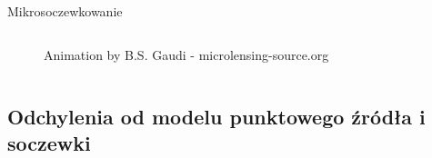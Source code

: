 \documentclass{beamer}
\begin{document}
\begin{frame}{Mikrosoczewkowanie}
\begin{columns}
\begin{column}{0.4\linewidth}
\begin{figure}
                \caption*{\tiny{Animation by B.S. Gaudi - microlensing-source.org}}
            \end{figure}
        \end{column}
    \end{columns}

\end{frame}

\subsection{Odchylenia od modelu punktowego źródła i soczewki}
\end{document}
